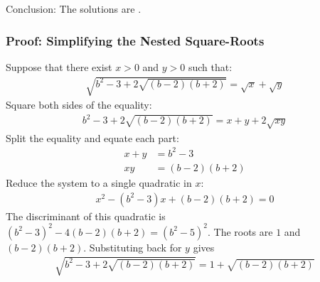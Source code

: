 Conclusion: The solutions are .


\subsubsection*{Proof: Simplifying the Nested Square-Roots}
Suppose that there exist $x>0$ and $y>0$ such that:
\begin{align*}
\sqrt{b^{2}-3+2\sqrt{(b-2)(b+2)}}
= \sqrt{x} + \sqrt{y}
\end{align*}
Square both sides of the equality:
\begin{align*}
b^{2}-3+2\sqrt{(b-2)(b+2)}
= x + y + 2\sqrt{xy}
\end{align*}
Split the equality and equate each part:
\begin{align*}
x + y & = b^{2}-3
\\
x y & = (b-2)(b+2)
\end{align*}
Reduce the system to a single quadratic in $x$:
\begin{align*}
x^{2} - (b^{2}-3) x + (b-2)(b+2) = 0
\end{align*}
The discriminant of this quadratic is ${(b^{2}-3)^{2}-4(b-2)(b+2)=(b^{2}-5)^{2}}$. The roots are $1$ and $(b-2)(b+2)$. Substituting back for $y$ gives
\begin{align*}
\sqrt{b^{2}-3+2\sqrt{(b-2)(b+2)}}
= 1 + \sqrt{(b-2)(b+2)}
\end{align*}
